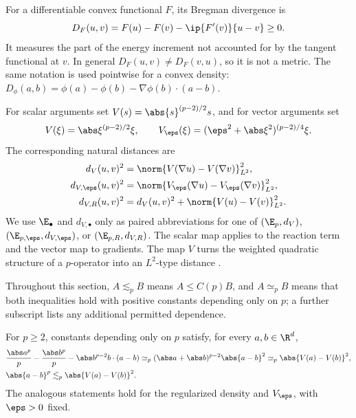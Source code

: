 For a differentiable convex functional \(F\), its Bregman divergence is
\begin{equation}
 D_F(u,v)=F(u)-F(v)-\ip{F'(v)}{u-v}\geq0.
 \label{eq:bregman-definition}
\end{equation}
It measures the part of the energy increment not accounted for by the tangent functional at \(v\). In
general \(D_F(u,v)\neq D_F(v,u)\), so it is not a metric. The same notation is used pointwise for a
convex density: \(D_\phi(a,b)=\phi(a)-\phi(b)-\nabla\phi(b)\cdot(a-b)\).

For scalar arguments set \(V(s)=\abs{s}^{(p-2)/2}s\), and for vector arguments set
\[
 V(\xi)=\abs\xi^{(p-2)/2}\xi,
 \qquad
 V_\eps(\xi)=(\eps^2+\abs\xi^2)^{(p-2)/4}\xi.
\]
The corresponding natural distances are
\begin{align*}
 d_V(u,v)^2&=\norm{V(\nabla u)-V(\nabla v)}_{L^2}^2,\\
 d_{V,\eps}(u,v)^2&=\norm{V_\eps(\nabla u)-V_\eps(\nabla v)}_{L^2}^2,\\
d_{V,R}(u,v)^2&=d_V(u,v)^2+
 \norm{V(u)-V(v)}_{L^2}^2.
\end{align*}
We use \(\E_\bullet\) and \(d_{V,\bullet}\) only as paired abbreviations for one of
\((\E_p,d_V)\), \((\E_{p,\eps},d_{V,\eps})\), or \((\E_{p,R},d_{V,R})\). The scalar map applies to
the reaction term and the vector map to gradients. The map \(V\) turns the weighted quadratic
structure of a \(p\)-operator into an \(L^2\)-type distance
\citep{BarrettLiu1993,DieningKreuzer2008,LeePark2025}.

Throughout this section, \(A\lesssim_p B\) means \(A\leq C(p)B\), and \(A\simeq_p B\) means that
both inequalities hold with positive constants depending only on \(p\); a further subscript lists
any additional permitted dependence.

\begin{lemma}
\label{lem:pstructure}
For \(p\geq2\), constants depending only on \(p\) satisfy, for every
\(a,b\in\R^d\),
\begin{align}
 &\frac{\abs a^p}{p}-\frac{\abs b^p}{p}
 -\abs b^{p-2}b\cdot(a-b)
 \simeq_p(\abs a+\abs b)^{p-2}\abs{a-b}^2
 \simeq_p\abs{V(a)-V(b)}^2,
 \label{eq:pstructure}\\
 &\abs{a-b}^p\lesssim_p\abs{V(a)-V(b)}^2.
 \label{eq:pcontrol}
\end{align}
The analogous statements hold for the regularized density and \(V_\eps\), with \(\eps>0\) fixed.
\end{lemma}

